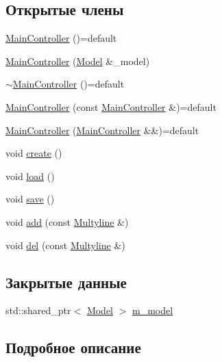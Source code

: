 \subsection*{Открытые члены}
\begin{DoxyCompactItemize}
\item 
\hyperlink{class_main_controller_ab04905d2ca29c6375c6cde8201327b06}{Main\-Controller} ()=default
\item 
\hyperlink{class_main_controller_a457b718690b3c2101b00ea2295d5c4b3}{Main\-Controller} (\hyperlink{class_model}{Model} \&\-\_\-model)
\item 
\hyperlink{class_main_controller_aa7e960df99b2c9f24abc52d7863c7fa1}{$\sim$\-Main\-Controller} ()=default
\item 
\hyperlink{class_main_controller_aedd8d4a7b9cb71ab9b95912d0786a4e3}{Main\-Controller} (const \hyperlink{class_main_controller}{Main\-Controller} \&)=default
\item 
\hyperlink{class_main_controller_af1951b682e657fd7e43d354159984a3f}{Main\-Controller} (\hyperlink{class_main_controller}{Main\-Controller} \&\&)=default
\item 
void \hyperlink{class_main_controller_a4875e8ce5645793e06377d758cfba6ef}{create} ()
\item 
void \hyperlink{class_main_controller_a3dedc9e9860fb2e153310d7372038c0d}{load} ()
\item 
void \hyperlink{class_main_controller_a06797caf7960caaa8276b30ee488eb1d}{save} ()
\item 
void \hyperlink{class_main_controller_a56fa760f0bbc517c14b770fac94d0fe1}{add} (const \hyperlink{class_multyline}{Multyline} \&)
\item 
void \hyperlink{class_main_controller_a83908eb37bff0af06054fb8ef5de017d}{del} (const \hyperlink{class_multyline}{Multyline} \&)
\end{DoxyCompactItemize}
\subsection*{Закрытые данные}
\begin{DoxyCompactItemize}
\item 
std\-::shared\-\_\-ptr$<$ \hyperlink{class_model}{Model} $>$ \hyperlink{class_main_controller_aec52515a794e452bbf6ccf186d96cc53}{m\-\_\-model}
\end{DoxyCompactItemize}


\subsection{Подробное описание}


